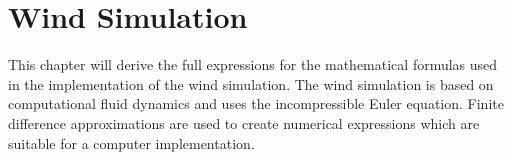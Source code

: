 \chapter{Wind Simulation}

This chapter will derive the full expressions for the mathematical formulas 
used in the implementation of the wind simulation. The wind simulation is 
based on computational fluid dynamics and uses the incompressible Euler 
equation. Finite difference approximations are used to create numerical 
expressions which are suitable for a computer implementation. 

